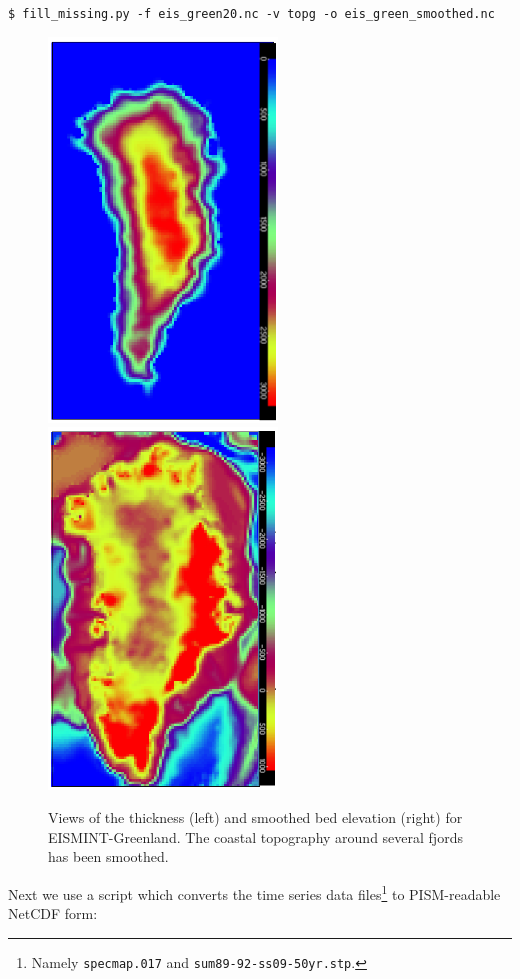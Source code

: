 \documentclass[11pt,final]{amsart}
\begin{document}
\verb|$ fill_missing.py -f eis_green20.nc -v topg -o eis_green_smoothed.nc|

\begin{figure}[ht]
\includegraphics[width=2.4in,keepaspectratio=true]{figs/EISgreen_thick}\quad\includegraphics[width=2.4in,keepaspectratio=true]{figs/EISgreen_bed}
\caption{Views of the thickness (left) and smoothed bed elevation (right) for EISMINT-Greenland.  The coastal topography around several fjords has been smoothed.}
\label{fig:greendata}
\end{figure}

Next we use a script which converts the time series data files\footnote{Namely \texttt{specmap.017} and \texttt{sum89-92-ss09-50yr.stp}.} to PISM-readable NetCDF form:
\end{document}
